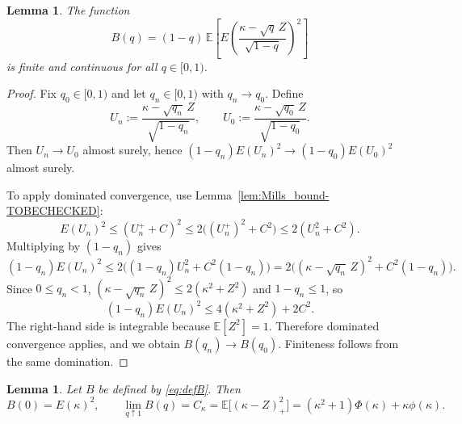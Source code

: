 \documentclass[11pt]{article}
\newtheorem{lemma}[theorem]{Lemma}
\begin{document}
\begin{lemma}\label{lem:B_cont0-TOBECHECKED}
The function
\[
B(q)=(1-q)\,\mathbb E\!\left[E\!\left(\frac{\kappa-\sqrt{q}\,Z}{\sqrt{1-q}}\right)^2\right]
\]
is finite and continuous for all $q\in[0,1)$.
\end{lemma}
\begin{proof}
Fix $q_0\in[0,1)$ and let $q_n\in [0,1)$ with $q_n\to q_0$. Define
\[
U_n:=\frac{\kappa-\sqrt{q_n}\,Z}{\sqrt{1-q_n}},\qquad
U_0:=\frac{\kappa-\sqrt{q_0}\,Z}{\sqrt{1-q_0}}.
\]
Then $U_n\to U_0$ almost surely, hence $(1-q_n)E(U_n)^2\to (1-q_0)E(U_0)^2$ almost surely.

To apply dominated convergence, use Lemma~\ref{lem:Mills_bound-TOBECHECKED}:
\[
E(U_n)^2\le (U_n^+ + C)^2\le 2\big((U_n^+)^2+C^2\big)\le 2(U_n^2+C^2).
\]
Multiplying by $(1-q_n)$ gives
\[
(1-q_n)E(U_n)^2
\le 2\big((1-q_n)U_n^2 + C^2(1-q_n)\big)
=2\big((\kappa-\sqrt{q_n}\,Z)^2 + C^2(1-q_n)\big).
\]
Since $0\le q_n< 1$, $(\kappa-\sqrt{q_n}\,Z)^2\le 2(\kappa^2+Z^2)$ and
$1-q_n \le 1$, so
\[
(1-q_n)E(U_n)^2\le 4(\kappa^2+Z^2)+2C^2.
\]
The right-hand side is integrable because $\mathbb E[Z^2]=1$. Therefore dominated convergence
applies, and we obtain $B(q_n)\to B(q_0)$. Finiteness follows from the same domination.
\end{proof}

\begin{lemma}\label{lem:B_endpoints-TOBECHECKED}
Let $B$ be defined by \eqref{eq:defB}. Then
\[
B(0)=E(\kappa)^2,
\qquad
\lim_{q\uparrow 1}B(q)=C_{\kappa}=\mathbb E\big[(\kappa-Z)_+^2\big]=(\kappa^2+1)\Phi(\kappa)+\kappa\phi(\kappa).
\]
\end{lemma}
\end{document}
